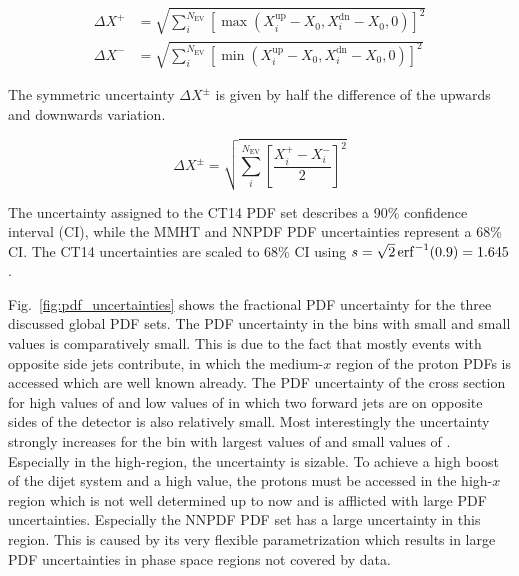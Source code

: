 \begin{equation*}
\begin{aligned}
    \Delta X^+ &= \sqrt{\sum_i^{N_{\mathrm{EV}}} \left[ \max(X_i^{\mathrm{up}}
    -X_0, X_i^{\mathrm{dn}} - X_0, 0)\right]^2}\\
\Delta X^- &= \sqrt{\sum_i^{N_{\mathrm{EV}}} \left[ \min(X_i^{\mathrm{up}} - X_0, X_i^{\mathrm{dn}} - X_0,0)\right]^2}
\end{aligned}
\end{equation*}

The symmetric uncertainty $\Delta X^{\pm}$ is given by half the difference of the upwards and
downwards variation.

\begin{equation*}
    \Delta X^{\pm} = \sqrt{\sum_i^{N_{\mathrm{EV}}} \left[ \frac{X_i^+ -
    X_i^-}{2} \right]^2}
\end{equation*}

The uncertainty assigned to the CT14 PDF set describes a 90\% confidence
interval (CI), while the MMHT and NNPDF PDF uncertainties represent a 68\% CI.
The CT14 uncertainties are scaled to 68\% CI using $s = \sqrt{2}
\operatorname{erf}^{-1}(0.9) = 1.645$.

Fig.~\ref{fig:pdf_uncertainties} shows the fractional PDF uncertainty for the
three discussed global PDF sets. The PDF uncertainty in the bins with small
\ystar and small \yboost values is comparatively small. This is due to the fact
that mostly events with opposite side jets contribute, in which the medium-$x$
region of the proton PDFs is accessed which are well known already. The PDF
uncertainty of the cross section for high values of \ystar and low values of
\yboost in which two forward jets are on opposite sides of the detector is also
relatively small. Most interestingly the uncertainty strongly increases for the
bin with largest values of \yboost and small values of \ystar.  Especially in
the high-\pt region, the uncertainty is sizable. To achieve a high boost of the
dijet system and a high \ptavg value, the protons must be accessed in the
high-$x$ region which is not well determined up to now and is afflicted with
large PDF uncertainties. Especially the NNPDF PDF set has a large uncertainty in
this region. This is caused by its very flexible parametrization which results
in large PDF uncertainties in phase space regions not covered by data.

